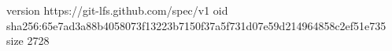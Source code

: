 version https://git-lfs.github.com/spec/v1
oid sha256:65e7ad3a88b4058073f13223b7150f37a5f731d07e59d214964858c2ef51e735
size 2728
